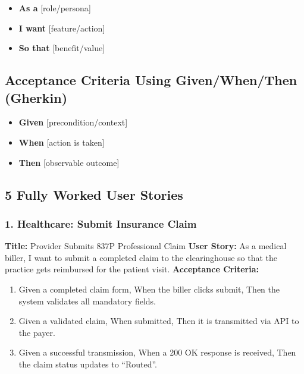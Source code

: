 \documentclass[
  11pt,
  openany,
  oneside]{book}
\providecommand{\tightlist}{%
  \setlength{\itemsep}{0pt}\setlength{\parskip}{0pt}}
\begin{document}
\begin{itemize}
\tightlist
\item
  \textbf{As a} {[}role/persona{]}
\item
  \textbf{I want} {[}feature/action{]}
\item
  \textbf{So that} {[}benefit/value{]}
\end{itemize}

\subsection{Acceptance Criteria Using Given/When/Then
(Gherkin)}\label{acceptance-criteria-using-givenwhenthen-gherkin}

\begin{itemize}
\tightlist
\item
  \textbf{Given} {[}precondition/context{]}
\item
  \textbf{When} {[}action is taken{]}
\item
  \textbf{Then} {[}observable outcome{]}
\end{itemize}

\subsection{5 Fully Worked User
Stories}\label{fully-worked-user-stories}

\subsubsection{1. Healthcare: Submit Insurance
Claim}\label{healthcare-submit-insurance-claim}

\textbf{Title:} Provider Submits 837P Professional Claim \textbf{User
Story:} As a medical biller, I want to submit a completed claim to the
clearinghouse so that the practice gets reimbursed for the patient
visit. \textbf{Acceptance Criteria:}

\begin{enumerate}
\def\labelenumi{\arabic{enumi}.}
\tightlist
\item
  Given a completed claim form, When the biller clicks submit, Then the
  system validates all mandatory fields.
\item
  Given a validated claim, When submitted, Then it is transmitted via
  API to the payer.
\item
  Given a successful transmission, When a 200 OK response is received,
  Then the claim status updates to ``Routed''.
\end{enumerate}
\end{document}
